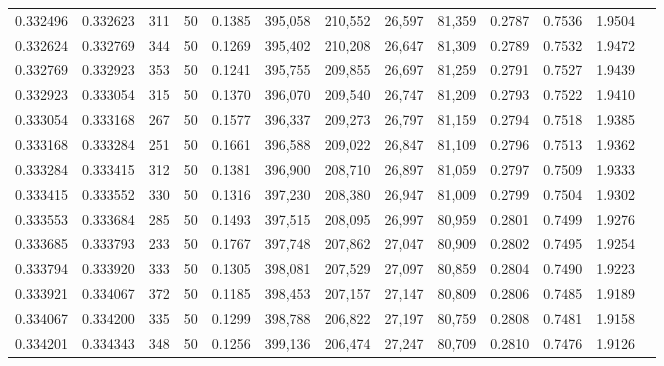 \begin{tabular}{rrrrrrrrrrrrr}
0.332496 & 0.332623 &   311 &  50 &                                     0.1385 & 395,058 & 210,552 &  26,597 &  81,359 & 0.2787 & 0.7536 & 1.9504 \\
0.332624 & 0.332769 &   344 &  50 &                                     0.1269 & 395,402 & 210,208 &  26,647 &  81,309 & 0.2789 & 0.7532 & 1.9472 \\
0.332769 & 0.332923 &   353 &  50 &                                     0.1241 & 395,755 & 209,855 &  26,697 &  81,259 & 0.2791 & 0.7527 & 1.9439 \\
0.332923 & 0.333054 &   315 &  50 &                                     0.1370 & 396,070 & 209,540 &  26,747 &  81,209 & 0.2793 & 0.7522 & 1.9410 \\
0.333054 & 0.333168 &   267 &  50 &                                     0.1577 & 396,337 & 209,273 &  26,797 &  81,159 & 0.2794 & 0.7518 & 1.9385 \\
0.333168 & 0.333284 &   251 &  50 &                                     0.1661 & 396,588 & 209,022 &  26,847 &  81,109 & 0.2796 & 0.7513 & 1.9362 \\
0.333284 & 0.333415 &   312 &  50 &                                     0.1381 & 396,900 & 208,710 &  26,897 &  81,059 & 0.2797 & 0.7509 & 1.9333 \\
0.333415 & 0.333552 &   330 &  50 &                                     0.1316 & 397,230 & 208,380 &  26,947 &  81,009 & 0.2799 & 0.7504 & 1.9302 \\
0.333553 & 0.333684 &   285 &  50 &                                     0.1493 & 397,515 & 208,095 &  26,997 &  80,959 & 0.2801 & 0.7499 & 1.9276 \\
0.333685 & 0.333793 &   233 &  50 &                                     0.1767 & 397,748 & 207,862 &  27,047 &  80,909 & 0.2802 & 0.7495 & 1.9254 \\
0.333794 & 0.333920 &   333 &  50 &                                     0.1305 & 398,081 & 207,529 &  27,097 &  80,859 & 0.2804 & 0.7490 & 1.9223 \\
0.333921 & 0.334067 &   372 &  50 &                                     0.1185 & 398,453 & 207,157 &  27,147 &  80,809 & 0.2806 & 0.7485 & 1.9189 \\
0.334067 & 0.334200 &   335 &  50 &                                     0.1299 & 398,788 & 206,822 &  27,197 &  80,759 & 0.2808 & 0.7481 & 1.9158 \\
0.334201 & 0.334343 &   348 &  50 &                                     0.1256 & 399,136 & 206,474 &  27,247 &  80,709 & 0.2810 & 0.7476 & 1.9126 \\

\end{tabular}
